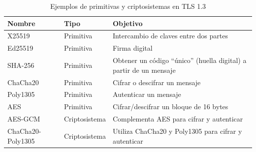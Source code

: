 \begin{table}[h!]
\centering
\renewcommand{\arraystretch}{1.5} %
\begin{tabular}{|>{\centering\arraybackslash}m{4cm}
|>{\centering\arraybackslash}m{3cm}
|>{\centering\arraybackslash}m{7cm}|}
\hline
\textbf{Nombre} & \textbf{Tipo} & \textbf{Objetivo} \\ \hline
X25519 & Primitiva & Intercambio de claves entre dos partes \\ \hline
Ed25519 & Primitiva & Firma digital \\ \hline
SHA-256 & Primitiva & Obtener un código ``único'' (huella digital) a partir de un mensaje \\ \hline
ChaCha20 & Primitiva & Cifrar o descifrar un mensaje\\ \hline
Poly1305 & Primitiva & Autenticar un mensaje \\ \hline
AES & Primitiva & Cifrar/descifrar un bloque de 16 bytes \\ \hline
AES-GCM & Criptosistema & Complementa AES para cifrar y autenticar \\ \hline
ChaCha20-Poly1305 & Criptosistema & Utiliza ChaCha20 y Poly1305 para cifrar y autenticar \\ \hline
\end{tabular}
\caption{Ejemplos de primitivas y criptosistemas en TLS 1.3}
\end{table}



\newif\ifTFGampliado   %


\newenvironment{TFGampliado}{
  \ifTFGampliado
    \begingroup
    \color{ForestGreen}%
  \else
    \setbox0\vbox\bgroup
  \fi
}{
  \ifTFGampliado
    \endgroup
  \else
    \egroup
  \fi
}